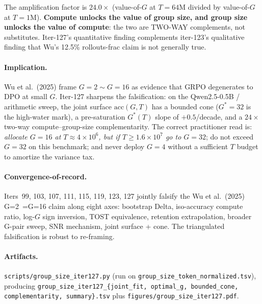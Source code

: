The amplification factor is $24.0\times$ (value-of-$G$ at
$T{=}64$M divided by value-of-$G$ at $T{=}1$M). \textbf{Compute unlocks
the value of group size, and group size unlocks the value of compute}:
the two are TWO-WAY complements, not substitutes. Iter-127's
quantitative finding complements iter-123's qualitative finding that
Wu's 12.5\% rollouts-frac claim is not generally true.

\paragraph{Implication.}
Wu et al.\ (2025) frame $G{=}2\sim G{=}16$ as evidence that GRPO
degenerates to DPO at small $G$. Iter-127 sharpens the falsification:
on the Qwen2.5-0.5B / arithmetic sweep, the joint surface
$\mathrm{acc}(G,T)$ has a bounded cone ($G^{\ast}{=}32$ is the
high-water mark), a pre-saturation $G^{\ast}(T)$ slope of $+0.5$/decade,
and a $24\times$ two-way compute--group-size complementarity. The
correct practitioner read is: \emph{allocate $G{=}16$ at
$T{\approx}4{\times}10^{6}$, but if $T{\ge}1.6{\times}10^{7}$ go to
$G{=}32$}; do not exceed $G{=}32$ on this benchmark; and never deploy
$G{=}4$ without a sufficient $T$ budget to amortize the variance tax.

\paragraph{Convergence-of-record.}
Iters~99, 103, 107, 111, 115, 119, 123, 127 jointly falsify the Wu et
al.\ (2025) G=2~=G=16 claim along eight axes: bootstrap Delta,
iso-accuracy compute ratio, log-$G$ sign inversion, TOST
equivalence, retention extrapolation, broader G-pair sweep, SNR
mechanism, joint surface + cone. The triangulated falsification is
robust to re-framing.

\paragraph{Artifacts.}
\texttt{scripts/group\_size\_iter127.py} (run on
\texttt{group\_size\_token\_normalized.tsv}), producing
\texttt{group\_size\_iter127\_\{joint\_fit, optimal\_g, bounded\_cone,
complementarity, summary\}.tsv} plus
\texttt{figures/group\_size\_iter127.pdf}.
